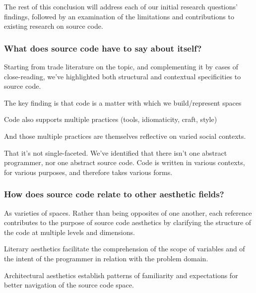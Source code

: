 The rest of this conclusion will address each of our initial research questions' findings, followed by an examination of the limitations and contributions to existing research on source code.

\subsubsection{What does source code have to say about itself?} %

Starting from trade literature on the topic, and complementing it by cases of close-reading, we've highlighted both structural and contextual specificities to source code.


The key finding is that code is a matter with which we build/represent spaces

Code also supports multiple practices (tools, idiomaticity, craft, style)

And those multiple practices are themselves reflective on varied social contexts.

That it's not single-faceted. We've identified that there isn't one abstract programmer, nor one abstract source code. Code is written in various contexts, for various purposes, and therefore takes various forms.

\subsubsection{How does source code relate to other aesthetic fields?} %

As varieties of spaces. Rather than being opposites of one another, each reference contributes to the purpose of source code aesthetics by clarifying the structure of the code at multiple levels and dimensions.

Literary aesthetics facilitate the comprehension of the scope of variables and of the intent of the programmer in relation with the problem domain.

Architectural aesthetics establish patterns of familiarity and expectations for better navigation of the source code space.

